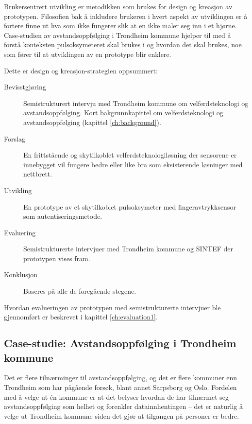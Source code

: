Brukersentrert utvikling er metodikken som brukes for design og kreasjon av prototypen. Filosofien bak å inkludere brukeren i hvert aspekt
av utviklingen er å fortere finne ut hva som ikke fungerer slik at en ikke maler seg inn i et hjørne. Case-studien av avstandsoppfølging
i Trondheim kommune hjelper til med å forstå konteksten pulsoksymeteret skal brukes i og hvordan det skal brukes, noe
som fører til at utviklingen av en prototype blir enklere.

\begin{minipage}{\linewidth}
Dette er design og kreasjon-strategien oppsummert:\newline

\begin{description}
  \item [Bevisstgjøring] Semistrukturert intervju med Trondheim kommune om velferdsteknologi og avstandsoppfølging. Kort bakgrunnkapittel
      om velferdsteknologi og avstandsoppfølging (kapittel \ref{ch:background}).
  \item [Forslag] En frittstående og skytilkoblet velferdsteknologiløsning der sensorene er innebygget vil fungere bedre
      eller like bra som eksisterende løsninger med nettbrett.
  \item [Utvikling] En prototype av et skytilkoblet pulsoksymeter med fingeravtrykksensor som autentiseringsmetode.
  \item [Evaluering] Semistrukturerte intervjuer med Trondheim kommune og SINTEF der prototypen vises fram.
  \item [Konklusjon] Baseres på alle de foregående stegene.
\end{description}
\end{minipage}

Hvordan evalueringen av prototypen med semistrukturerte intervjuer ble gjennomført er beskrevet i kapittel \ref{ch:evaluation1}.

\subsection{Case-studie: Avstandsoppfølging i Trondheim kommune}
Det er flere tilnærminger til avstandsoppfølging, og det er flere kommuner enn Trondheim som har pågående forsøk, blant annet
Sarpsborg og Oslo. Fordelen med å velge ut én kommune er at det belyser hvordan de har tilnærmet seg avstandsoppfølging
som helhet og forenkler datainnhentingen -- det er naturlig å velge ut Trondheim kommune siden det gjør at tilgangen på personer er bedre.

